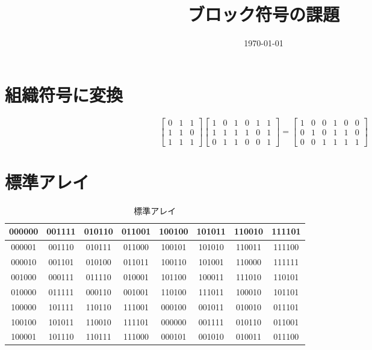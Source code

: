 \documentclass[a4paper,11pt]{jsarticle}
\begin{document}
\title{ブロック符号の課題}
\author{}
\date{\today}
\maketitle

\section{組織符号に変換}
\begin{equation*}
  \begin{bmatrix}
    0 & 1 & 1 \\
    1 & 1 & 0 \\
    1 & 1 & 1
  \end{bmatrix}
  \begin{bmatrix}
    1 & 0 & 1 & 0 & 1 & 1 \\
    1 & 1 & 1 & 1 & 0 & 1 \\
    0 & 1 & 1 & 0 & 0 & 1
  \end{bmatrix}=
  \begin{bmatrix}
    1 & 0 & 0 & 1 & 0 & 0 \\
    0 & 1 & 0 & 1 & 1 & 0 \\
    0 & 0 & 1 & 1 & 1 & 1
  \end{bmatrix}
\end{equation*}

\section{標準アレイ}
\begin{table}[hbtp]
  \caption{標準アレイ}
  \label{table:data_type}
  \centering
  \begin{tabular}{c|ccccccc}
    000000 & 001111 &	010110 & 011001	& 100100 & 101011 &	110010 & 111101 \\
    \hline
    000001 & 001110 &	010111 & 011000 &	100101 & 101010	& 110011 & 111100 \\
    000010 & 001101	& 010100 & 011011	& 100110 & 101001 & 110000 & 111111 \\
    001000 & 000111	& 011110 & 010001	& 101100 & 100011	& 111010 & 110101 \\
    010000 & 011111	& 000110 & 001001	& 110100 & 111011 & 100010 & 101101 \\
    100000 & 101111	& 110110 & 111001	& 000100 & 001011	& 010010 & 011101 \\
    100100 & 101011	& 110010 & 111101	& 000000 & 001111	& 010110 & 011001 \\
    100001 & 101110	& 110111 & 111000	& 000101 & 001010	& 010011 & 011100
  \end{tabular}
\end{table}
\end{document}
